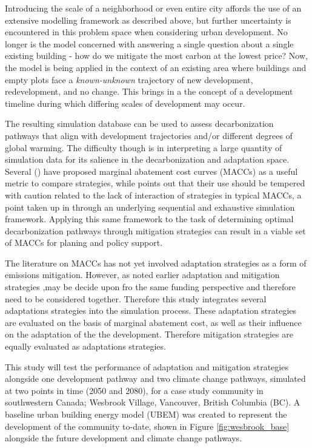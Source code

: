 \documentclass[twocolumn, a4paper,10pt]{article}
\begin{document}
Introducing the scale of a neighborhood or even entire city affords the use of an extensive modelling framework as described above, but further uncertainty is encountered in this problem space when considering urban development. No longer is the model concerned with answering a single question about a single existing building - how do we mitigate the most carbon at the lowest price? Now, the model is being applied in the context of an existing area where buildings and empty plots face a \textit{known-unknown} trajectory of new development, redevelopment, and no change. This brings in a the concept of a development timeline during which differing scales of development may occur.

The resulting simulation database can be used to assess decarbonization pathways that align with development trajectories and/or different degrees of global warming. The difficulty though is in interpreting a large quantity of simulation data for its salience in the decarbonization and adaptation space. Several (\citep{}) have proposed marginal abatement cost curves (MACCs) as a useful metric to compare strategies, while \citet{kesicki_marginal_nodate} points out that their use should be tempered with caution related to the lack of interaction of strategies in typical MACCs, a point taken up in \citet{rysanek MACC} through an underlying sequential and exhaustive simulation framework. Applying this same framework to the task of determining optimal decarbonization pathways through mitigation strategies can result in a viable set of MACCs for planing and policy support.

The literature on MACCs has not yet involved adaptation strategies as a form of emissions mitigation. However, as noted earlier adaptation and mitigation strategies ,may be decide upon fro the same funding perspective and therefore need to be considered together. Therefore this study integrates several adaptations strategies into the simulation process. These adaptation strategies are evaluated on the basis of marginal abatement cost, as well as their influence on the adaptation of the the development. Therefore mitigation strategies are equally evaluated as adaptations strategies. 

This study will test the performance of adaptation and mitigation strategies alongside one development pathway and two climate change pathways, simulated at two points in time (2050 and 2080), for a case study community in southwestern Canada; Wesbrook Village, Vancouver, British Columbia (BC). A baseline urban building energy model (UBEM) was created to represent the development of the community to-date, shown in Figure \ref{fig:wesbrook_base} alongside the future development and climate change pathways.
\end{document}
